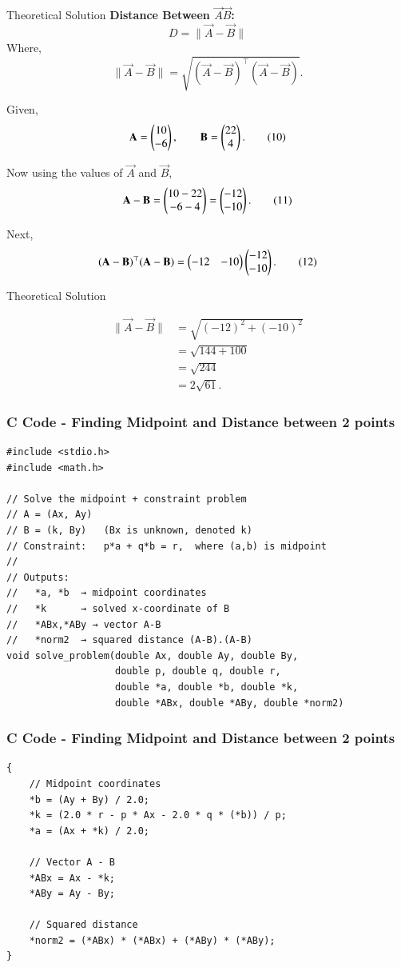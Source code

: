 \documentclass{beamer}
\begin{document}
\begin{frame}{Theoretical Solution}
\textbf{Distance Between \(\vec{A}\vec{B}\):}
\[
D=\|\vec{A}-\vec{B}\| \tag{8}
\]
Where,
\[
\|\vec{A}-\vec{B}\|=\sqrt{(\vec{A}-\vec{B})^{\top}(\vec{A}-\vec{B})}. \tag{9}
\]

Given,
\[
\mathbf{A}=\begin{pmatrix}10\\-6\end{pmatrix},\qquad \mathbf{B}=\begin{pmatrix}22\\4\end{pmatrix}. \tag{10}
\]

Now using the values of \(\vec{A}\) and \(\vec{B}\),
\[
\mathbf{A}-\mathbf{B}=\begin{pmatrix}10-22\\-6-4\end{pmatrix}=\begin{pmatrix}-12\\-10\end{pmatrix}. \tag{11}
\]

Next,
\[
(\mathbf{A}-\mathbf{B})^{\top}(\mathbf{A}-\mathbf{B})=\begin{pmatrix}-12&-10\end{pmatrix}\begin{pmatrix}-12\\-10\end{pmatrix}. \tag{12}
\]
\end{frame}
\begin{frame}{Theoretical Solution}

\begin{align}
\|\vec{A}-\vec{B}\|&=\sqrt{(-12)^2+(-10)^2} \tag{13}\\
      &=\sqrt{144+100} \tag{14}\\
      &=\sqrt{244} \tag{15}\\
      &=\boxed{2\sqrt{61}}. \tag{16}
\end{align}
\end{frame}

\begin{frame}[fragile]
    \frametitle{C Code - Finding Midpoint and Distance between 2 points}

    \begin{lstlisting}
#include <stdio.h>
#include <math.h>

// Solve the midpoint + constraint problem
// A = (Ax, Ay)
// B = (k, By)   (Bx is unknown, denoted k)
// Constraint:   p*a + q*b = r,  where (a,b) is midpoint
//
// Outputs:
//   *a, *b  → midpoint coordinates
//   *k      → solved x-coordinate of B
//   *ABx,*ABy → vector A-B
//   *norm2  → squared distance (A-B).(A-B)
void solve_problem(double Ax, double Ay, double By,
                   double p, double q, double r,
                   double *a, double *b, double *k,
                   double *ABx, double *ABy, double *norm2)
\end{lstlisting}
\end{frame}

                   \begin{frame}[fragile]
    \frametitle{C Code - Finding Midpoint and Distance between 2 points}

    \begin{lstlisting}
{
    // Midpoint coordinates
    *b = (Ay + By) / 2.0;
    *k = (2.0 * r - p * Ax - 2.0 * q * (*b)) / p;
    *a = (Ax + *k) / 2.0;

    // Vector A - B
    *ABx = Ax - *k;
    *ABy = Ay - By;

    // Squared distance
    *norm2 = (*ABx) * (*ABx) + (*ABy) * (*ABy);
}
\end{lstlisting}
\end{frame}
\end{document}
